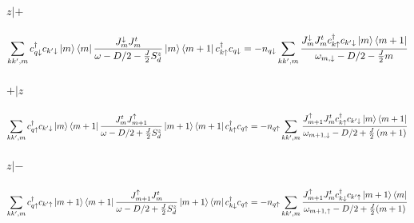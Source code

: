 \documentclass[12pt]{revtex4-2}
\begin{document}
\paragraph{\(z|+\)}
\begin{equation}\begin{aligned}
	\sum_{kk^\prime,m} c^\dagger_{q \downarrow} c_{k^\prime \downarrow} \ket{m}\bra{m}\frac{J^\downarrow_m{J^t_m}}{\omega - D/2 - \frac{J}{2}S_d^z}\ket{m}\bra{m+1} c^\dagger_{k \uparrow}c_{q \downarrow} = -n_{q \downarrow}\sum_{kk^\prime,m}\frac{J^\downarrow_m J^t_m c^\dagger_{k \uparrow}c_{k^\prime\downarrow} \ket{m}\bra{m+1}}{\omega_{m, \downarrow} - D/2 - \frac{J}{2}m}
\end{aligned}\end{equation}

\paragraph{\(+|z\)}
\begin{equation}\begin{aligned}
	\sum_{kk^\prime,m} c^\dagger_{q \uparrow}c_{k^\prime \downarrow} \ket{m}\bra{m+1}\frac{{J^t_m}J^\uparrow_{m+1}}{\omega - D/2 + \frac{J}{2}S_d^z} \ket{m+1}\bra{m+1} c^\dagger_{k \uparrow} c_{q \uparrow} = -n_{q \uparrow}\sum_{kk^\prime,m}\frac{J^\uparrow_{m+1} J^t_m c^\dagger_{k \uparrow}c_{k^\prime\downarrow} \ket{m}\bra{m+1}}{\omega_{m+1, \downarrow} - D/2 + \frac{J}{2}\left(m+1\right) }
\end{aligned}\end{equation}

\paragraph{\(z|-\)}
\begin{equation}\begin{aligned}
	\sum_{kk^\prime,m} c^\dagger_{q \uparrow} c_{k^\prime \uparrow} \ket{m+1}\bra{m+1}\frac{J^\uparrow_{m+1}{J^t_m}}{\omega - D/2 + \frac{J}{2}S_d^z}\ket{m+1}\bra{m} c^\dagger_{k \downarrow}c_{q \uparrow} = -n_{q \uparrow}\sum_{kk^\prime,m}\frac{J^\uparrow_{m+1} J^t_m c^\dagger_{k \downarrow}c_{k^\prime\uparrow} \ket{m+1}\bra{m}}{\omega_{m+1, \uparrow} - D/2 + \frac{J}{2}(m+1)}
\end{aligned}\end{equation}
\end{document}
